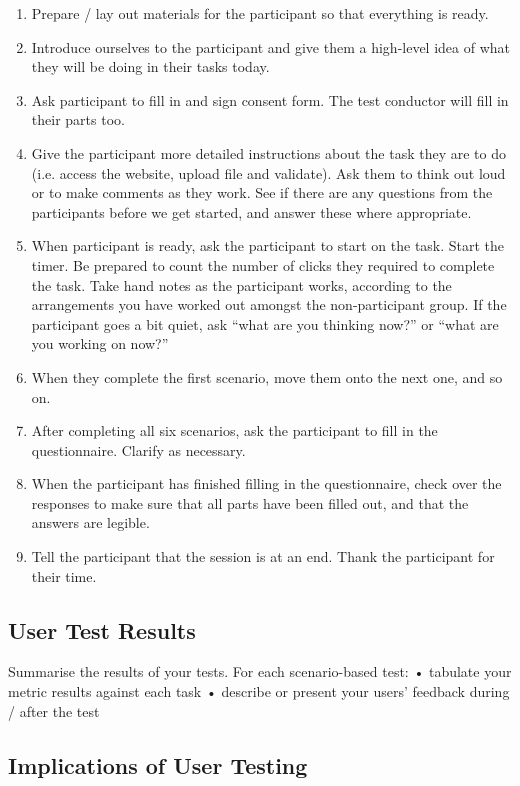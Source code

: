 \documentclass[10pt]{article}
\begin{document}
\begin{enumerate}
\item Prepare / lay out materials for the participant so that everything is ready.
\item Introduce ourselves to the participant and give them a high-level idea of what they will be doing in their tasks today.
\item Ask participant to fill in and sign consent form. The test conductor will fill in their parts too.
\item Give the participant more detailed instructions about the task they are to do (i.e. access the website, upload file and validate). Ask them to think out loud or to make comments as they work. See if there are any questions from the participants before we get started, and answer these where appropriate.
\item When participant is ready, ask the participant to start on the task. Start the timer. Be prepared to count the number of clicks they required to complete the task. Take hand notes as the participant works, according to the arrangements you have worked out amongst the non-participant group. If the participant goes a bit quiet, ask “what are you thinking now?” or “what are you working on now?”
\item When they complete the first scenario, move them onto the next one, and so on.
\item After completing all six scenarios, ask the participant to fill in the questionnaire. Clarify as necessary.
\item When the participant has finished filling in the questionnaire, check over the responses to make sure that all parts have been filled out, and that the answers are legible.
\item Tell the participant that the session is at an end. Thank the participant for their time.
\end{enumerate}

\subsection*{User Test Results}

Summarise the results of your tests. 
For each scenario-based test: 
• tabulate your metric results against each task 
• describe or present your users' feedback during / after the test 

\subsection*{Implications of User Testing}
\end{document}
